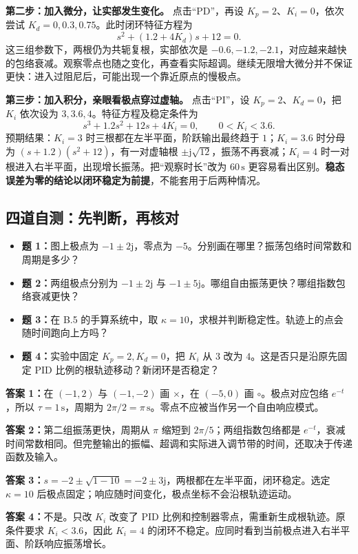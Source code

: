 \documentclass[UTF8,a4paper,11pt,fontset=windows]{ctexart}
\newcommand{\unit}[1]{\,\mathrm{#1}}
\begin{document}
\textbf{第二步：加入微分，让实部发生变化。}
点击“PD”，再设 $K_p=2$、$K_i=0$，依次尝试 $K_d=0,0.3,0.75$。此时闭环特征方程为
\[
  s^2+(1.2+4K_d)s+12=0.
\]
这三组参数下，两根仍为共轭复根，实部依次是 $-0.6,-1.2,-2.1$，对应越来越快的包络衰减。观察零点也随之变化，再查看实际超调。继续无限增大微分并不保证更快：进入过阻尼后，可能出现一个靠近原点的慢极点。

\textbf{第三步：加入积分，亲眼看极点穿过虚轴。}
点击“PI”，设 $K_p=2$、$K_d=0$，把 $K_i$ 依次设为 $3,3.6,4$。特征方程及稳定条件为
\[
  s^3+1.2s^2+12s+4K_i=0,
  \qquad 0<K_i<3.6.
\]
预期结果：$K_i=3$ 时三根都在左半平面，阶跃输出最终趋于 $1$；$K_i=3.6$ 时分母为 $(s+1.2)(s^2+12)$，有一对虚轴根 $\pm\mathrm{j}\sqrt{12}$，振荡不再衰减；$K_i=4$ 时一对根进入右半平面，出现增长振荡。把“观察时长”改为 $60\unit{s}$ 更容易看出区别。\textbf{稳态误差为零的结论以闭环稳定为前提}，不能套用于后两种情况。

\newpage
\subsection{四道自测：先判断，再核对}
\begin{itemize}
  \item \textbf{题 1：}图上极点为 $-1\pm2\mathrm{j}$，零点为 $-5$。分别画在哪里？振荡包络时间常数和周期是多少？
  \item \textbf{题 2：}两组极点分别为 $-1\pm2\mathrm{j}$ 与 $-1\pm5\mathrm{j}$。哪组自由振荡更快？哪组指数包络衰减更快？
  \item \textbf{题 3：}在 B.5 的手算系统中，取 $\kappa=10$，求根并判断稳定性。轨迹上的点会随时间跑向上方吗？
  \item \textbf{题 4：}实验中固定 $K_p=2,K_d=0$，把 $K_i$ 从 $3$ 改为 $4$。这是否只是沿原先固定 PID 比例的根轨迹移动？新闭环是否稳定？
\end{itemize}

\textbf{答案 1：}在 $(-1,2)$ 与 $(-1,-2)$ 画 $\times$，在 $(-5,0)$ 画 $\circ$。极点对应包络 $e^{-t}$，所以 $\tau=1\unit{s}$，周期为 $2\pi/2=\pi\unit{s}$。零点不应被当作另一个自由响应模式。

\textbf{答案 2：}第二组振荡更快，周期从 $\pi$ 缩短到 $2\pi/5$；两组指数包络都是 $e^{-t}$，衰减时间常数相同。但完整输出的振幅、超调和实际进入调节带的时间，还取决于传递函数及输入。

\textbf{答案 3：}$s=-2\pm\sqrt{1-10}=-2\pm3\mathrm{j}$，两根都在左半平面，闭环稳定。选定 $\kappa=10$ 后极点固定；响应随时间变化，极点坐标不会沿根轨迹运动。

\textbf{答案 4：}不是。只改 $K_i$ 改变了 PID 比例和控制器零点，需重新生成根轨迹。原条件要求 $K_i<3.6$，因此 $K_i=4$ 的闭环不稳定。应同时看到当前极点进入右半平面、阶跃响应振荡增长。
\end{document}
